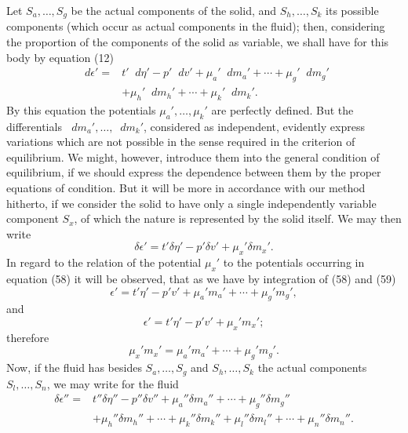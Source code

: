 \documentclass[11pt]{article}
\newcommand{\dd}{\mathop{}\!d}
\begin{document}
Let \(S_a,\ldots,S_g\) be the actual components of the solid, and \(S_h,\ldots,S_k\) its possible components (which occur as actual components in the fluid); then, considering the proportion of the components of the solid as variable, we shall have for this body by equation (12)
\begin{equation}
\begin{aligned}
\dd\epsilon'={}&t'\dd\eta'-p'\dd v'
+\mu_a'\dd m_a' +\cdots+\mu_g'\dd m_g' \\
&+\mu_h'\dd m_h' +\cdots+\mu_k'\dd m_k'.
\end{aligned}
\end{equation}
By this equation the potentials \(\mu_a',\ldots,\mu_k'\) are perfectly defined. But the differentials \(\dd m_a',\ldots,\dd m_k'\), considered as independent, evidently express variations which are not possible in the sense required in the criterion of equilibrium. We might, however, introduce them into the general condition of equilibrium, if we should express the dependence between them by the proper equations of condition. But it will be more in accordance with our method hitherto, if we consider the solid to have only a single independently variable component \(S_x\), of which the nature is represented by the solid itself. We may then write
\begin{equation}
\delta\epsilon'=t'\delta\eta'-p'\delta v'+\mu_x'\delta m_x'.
\end{equation}
In regard to the relation of the potential \(\mu_x'\) to the potentials occurring in equation (58) it will be observed, that as we have by integration of (58) and (59)
\begin{equation}
\epsilon'=t'\eta'-p'v'+\mu_a'm_a'+\cdots+\mu_g'm_g',
\end{equation}
and
\begin{equation}
\epsilon'=t'\eta'-p'v'+\mu_x'm_x';
\end{equation}
therefore
\begin{equation}
\mu_x'm_x'=\mu_a'm_a'+\cdots+\mu_g'm_g'.
\end{equation}
Now, if the fluid has besides \(S_a,\ldots,S_g\) and \(S_h,\ldots,S_k\) the actual components \(S_l,\ldots,S_n\), we may write for the fluid
\begin{equation}
\begin{aligned}
\delta\epsilon''={}&t''\delta\eta''-p''\delta v''
+\mu_a''\delta m_a''+\cdots+\mu_g''\delta m_g''\\
&+\mu_h''\delta m_h''+\cdots+\mu_k''\delta m_k''
+\mu_l''\delta m_l''+\cdots+\mu_n''\delta m_n''.
\end{aligned}
\end{equation}
\end{document}
